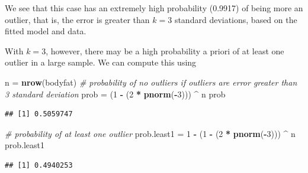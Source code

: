 \documentclass[]{book}
\newenvironment{Shaded}{\begin{snugshade}}{\end{snugshade}}
\newcommand{\KeywordTok}[1]{\textcolor[rgb]{0.13,0.29,0.53}{\textbf{#1}}}
\newcommand{\DecValTok}[1]{\textcolor[rgb]{0.00,0.00,0.81}{#1}}
\newcommand{\StringTok}[1]{\textcolor[rgb]{0.31,0.60,0.02}{#1}}
\newcommand{\CommentTok}[1]{\textcolor[rgb]{0.56,0.35,0.01}{\textit{#1}}}
\newcommand{\OperatorTok}[1]{\textcolor[rgb]{0.81,0.36,0.00}{\textbf{#1}}}
\newcommand{\NormalTok}[1]{#1}
\theoremstyle{definition}
\theoremstyle{definition}
\theoremstyle{definition}
\theoremstyle{remark}
\begin{document}
\begin{Shaded}
\end{Shaded}

We see that this case has an extremely high probability (0.9917) of
being more an outlier, that is, the error is greater than \(k=3\)
standard deviations, based on the fitted model and data.

With \(k=3\), however, there may be a high probability a priori of at
least one outlier in a large sample. We can compute this using

\begin{Shaded}
\begin{Highlighting}[]
\NormalTok{n =}\StringTok{ }\KeywordTok{nrow}\NormalTok{(bodyfat)}
\CommentTok{# probability of no outliers if outliers are error greater than 3 standard deviation}
\NormalTok{prob =}\StringTok{ }\NormalTok{(}\DecValTok{1} \OperatorTok{-}\StringTok{ }\NormalTok{(}\DecValTok{2} \OperatorTok{*}\StringTok{ }\KeywordTok{pnorm}\NormalTok{(}\OperatorTok{-}\DecValTok{3}\NormalTok{))) }\OperatorTok{^}\StringTok{ }\NormalTok{n}
\NormalTok{prob}
\end{Highlighting}
\end{Shaded}

\begin{verbatim}
## [1] 0.5059747
\end{verbatim}

\begin{Shaded}
\begin{Highlighting}[]
\CommentTok{# probability of at least one outlier}
\NormalTok{prob.least1 =}\StringTok{ }\DecValTok{1} \OperatorTok{-}\StringTok{ }\NormalTok{(}\DecValTok{1} \OperatorTok{-}\StringTok{ }\NormalTok{(}\DecValTok{2} \OperatorTok{*}\StringTok{ }\KeywordTok{pnorm}\NormalTok{(}\OperatorTok{-}\DecValTok{3}\NormalTok{))) }\OperatorTok{^}\StringTok{ }\NormalTok{n}
\NormalTok{prob.least1}
\end{Highlighting}
\end{Shaded}

\begin{verbatim}
## [1] 0.4940253
\end{verbatim}
\end{document}
